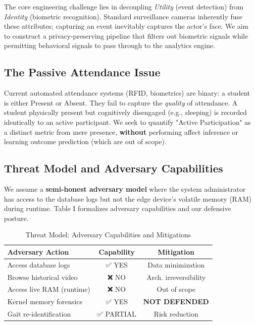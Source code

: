 \documentclass[conference]{IEEEtran}
\begin{document}
The core engineering challenge lies in decoupling \textit{Utility} (event detection) from \textit{Identity} (biometric recognition). Standard surveillance cameras inherently fuse these attributes; capturing an event inevitably captures the actor's face. We aim to construct a privacy-preserving pipeline that filters out biometric signals while permitting behavioral signals to pass through to the analytics engine.

\subsection{The Passive Attendance Issue}
Current automated attendance systems (RFID, biometrics) are binary: a student is either Present or Absent. They fail to capture the \textit{quality} of attendance. A student physically present but cognitively disengaged (e.g., sleeping) is recorded identically to an active participant. We seek to quantify "Active Participation" as a distinct metric from mere presence, \textbf{without} performing affect inference or learning outcome prediction (which are out of scope).

\subsection{Threat Model and Adversary Capabilities}
We assume a \textbf{semi-honest adversary model} where the system administrator has access to the database logs but not the edge device's volatile memory (RAM) during runtime. Table I formalizes adversary capabilities and our defensive posture.

\begin{table}[htbp]
\caption{Threat Model: Adversary Capabilities and Mitigations}
\begin{center}
\begin{tabular}{lcc}
\toprule
\textbf{Adversary Action} & \textbf{Capability} & \textbf{Mitigation} \\
\midrule
Access database logs & ✅ YES & Data minimization \\
Browse historical video & ❌ NO & Arch. irreversibility \\
Access live RAM (runtime) & ❌ NO & Out of scope \\
Kernel memory forensics & ✅ YES & \textbf{NOT DEFENDED} \\
Gait re-identification & ✅ PARTIAL & Risk reduction \\
\bottomrule
\end{tabular}
\end{center}
\end{table}
\end{document}
